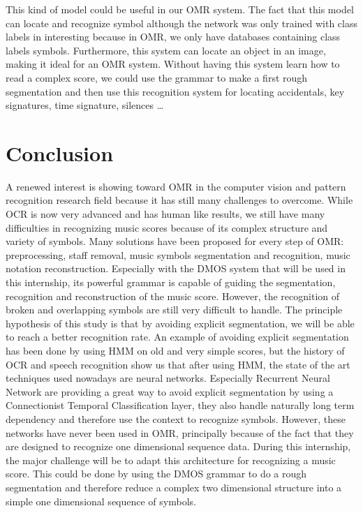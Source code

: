 \documentclass[11pt]{sdm}
\begin{document}
This kind of model could be useful in our OMR system.
The fact that this model can locate and recognize symbol although the network was only trained with class labels in interesting because in OMR, we only have databases containing class labels symbols.
Furthermore, this system can locate an object in an image, making it ideal for an OMR system.
Without having this system learn how to read a complex score, we could use the grammar to make a first rough segmentation and then use this recognition system for locating accidentals, key signatures, time signature, silences \ldots

\section{Conclusion}

A renewed interest is showing toward OMR in the computer vision and pattern recognition research field because it has still many challenges to overcome.
While OCR is now very advanced and has human like results, we still have many difficulties in recognizing music scores because of its complex structure and variety of symbols.
Many solutions have been proposed for every step of OMR: preprocessing, staff removal, music symbols segmentation and recognition, music notation reconstruction.
Especially with the DMOS system that will be used in this internship, its powerful grammar is capable of guiding the segmentation, recognition and reconstruction of the music score.
However, the recognition of broken and overlapping symbols are still very difficult to handle.
The principle hypothesis of this study is that by avoiding explicit segmentation, we will be able to reach a better recognition rate.
An example of avoiding explicit segmentation has been done by using HMM on old and very simple scores, but the history of OCR and speech recognition show us that after using HMM, the state of the art techniques used nowadays are neural networks.
Especially Recurrent Neural Network are providing a great way to avoid explicit segmentation by using a Connectionist Temporal Classification layer, they also handle naturally long term dependency and therefore use the context to recognize symbols.
However, these networks have never been used in OMR, principally because of the fact that they are designed to recognize one dimensional sequence data.
During this internship, the major challenge will be to adapt this architecture for recognizing a music score.
This could be done by using the DMOS grammar to do a rough segmentation and therefore reduce a complex two dimensional structure into a simple one dimensional sequence of symbols.
\end{document}
